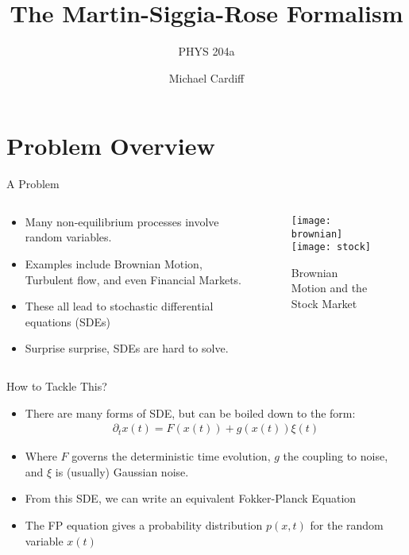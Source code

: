 \documentclass{beamer}
\title{The Martin-Siggia-Rose Formalism}
\author{Michael Cardiff}
\subtitle{PHYS 204a}
\def\D{\partial}
\begin{document}
\begin{frame}
  \titlepage
\end{frame}

\section{Problem Overview}
\begin{frame}{A Problem}
  \begin{columns}
    \begin{column}{0.5\textwidth}
      \begin{itemize}
      \item Many non-equilibrium processes involve random variables.
      \item Examples include Brownian Motion, Turbulent flow, and even Financial Markets. 
      \item These all lead to stochastic differential equations (SDEs)
      \item Surprise surprise, SDEs are hard to solve.
      \end{itemize}
    \end{column}
    \begin{column}{0.5\textwidth}
      \begin{figure}[H]
        \centering
        \texttt{[image: brownian]}
        \texttt{[image: stock]}
        \caption{Brownian Motion and the Stock Market}
      \end{figure}
    \end{column}
  \end{columns}
\end{frame}

\begin{frame}{How to Tackle This?}
  \begin{itemize}
  \item There are many forms of SDE, but can be boiled down to the form:
    \begin{align*}
      \D_t x(t)=F(x(t))+g(x(t))\xi(t)
    \end{align*}
  \item Where $F$ governs the deterministic time evolution, $g$ the coupling to noise, and $\xi$ is (usually) Gaussian noise.
  \item From this SDE, we can write an equivalent Fokker-Planck Equation
  \item The FP equation gives a probability distribution $p(x,t)$ for the random variable $x(t)$
  \end{itemize}
\end{frame}
\end{document}
